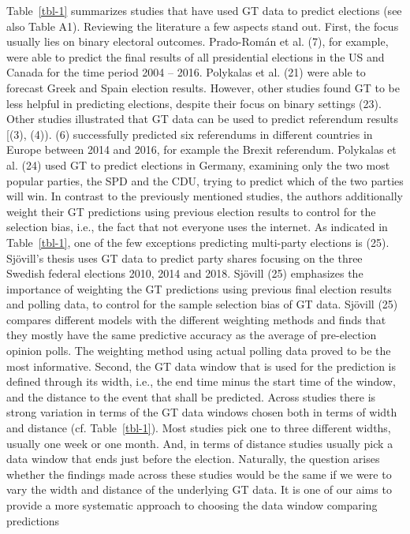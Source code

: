 \documentclass[
  letterpaper,
  DIV=11,
  numbers=noendperiod]{scrartcl}
\begin{document}
Table~\ref{tbl-1} summarizes studies that have used GT data to predict
elections (see also Table A1). Reviewing the literature a few aspects
stand out. First, the focus usually lies on binary electoral outcomes.
Prado-Román et al. (7), for example, were able to predict the ﬁnal
results of all presidential elections in the US and Canada for the time
period 2004 -- 2016. Polykalas et al. (21) were able to forecast Greek
and Spain election results. However, other studies found GT to be less
helpful in predicting elections, despite their focus on binary settings
(23). Other studies illustrated that GT data can be used to predict
referendum results {[}(3), (4)). (6) successfully predicted six
referendums in different countries in Europe between 2014 and 2016, for
example the Brexit referendum. Polykalas et al. (24) used GT to predict
elections in Germany, examining only the two most popular parties, the
SPD and the CDU, trying to predict which of the two parties will win. In
contrast to the previously mentioned studies, the authors additionally
weight their GT predictions using previous election results to control
for the selection bias, i.e., the fact that not everyone uses the
internet. As indicated in Table~\ref{tbl-1}, one of the few exceptions
predicting multi-party elections is (25). Sjövill's thesis uses GT data
to predict party shares focusing on the three Swedish federal elections
2010, 2014 and 2018. Sjövill (25) emphasizes the importance of weighting
the GT predictions using previous ﬁnal election results and polling
data, to control for the sample selection bias of GT data. Sjövill (25)
compares diﬀerent models with the diﬀerent weighting methods and finds
that they mostly have the same predictive accuracy as the average of
pre-election opinion polls. The weighting method using actual polling
data proved to be the most informative. Second, the GT data window that
is used for the prediction is defined through its width, i.e., the end
time minus the start time of the window, and the distance to the event
that shall be predicted. Across studies there is strong variation in
terms of the GT data windows chosen both in terms of width and distance
(cf. Table~\ref{tbl-1}). Most studies pick one to three different
widths, usually one week or one month. And, in terms of distance studies
usually pick a data window that ends just before the election.
Naturally, the question arises whether the findings made across these
studies would be the same if we were to vary the width and distance of
the underlying GT data. It is one of our aims to provide a more
systematic approach to choosing the data window comparing predictions
\end{document}
